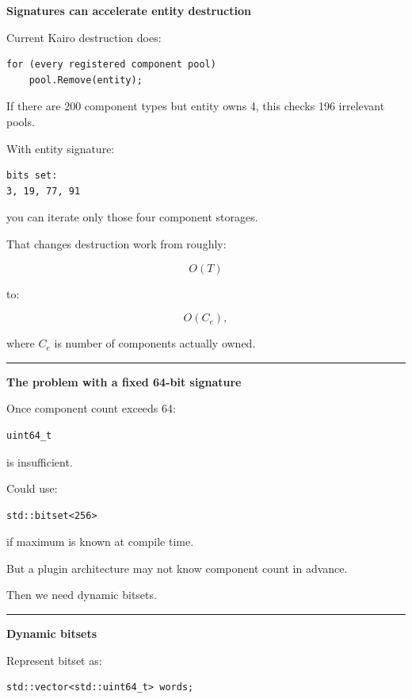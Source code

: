 \textbf{Signatures can accelerate entity destruction}

Current Kairo destruction does:

\begin{verbatim}
for (every registered component pool)
    pool.Remove(entity);
\end{verbatim}

If there are 200 component types but entity owns 4, this checks 196 irrelevant pools.

With entity signature:

\begin{verbatim}
bits set:
3, 19, 77, 91
\end{verbatim}

you can iterate only those four component storages.

That changes destruction work from roughly:

\[
O(T)
\]

to:

\[
O(C_e),
\]

where \(C_e\) is number of components actually owned.

\begin{center}\rule{0.5\linewidth}{0.5pt}\end{center}

\textbf{The problem with a fixed 64-bit signature}

Once component count exceeds 64:

\begin{verbatim}
uint64_t
\end{verbatim}

is insufficient.

Could use:

\begin{verbatim}
std::bitset<256>
\end{verbatim}

if maximum is known at compile time.

But a plugin architecture may not know component count in advance.

Then we need dynamic bitsets.

\begin{center}\rule{0.5\linewidth}{0.5pt}\end{center}

\textbf{Dynamic bitsets}

Represent bitset as:

\begin{verbatim}
std::vector<std::uint64_t> words;
\end{verbatim}

